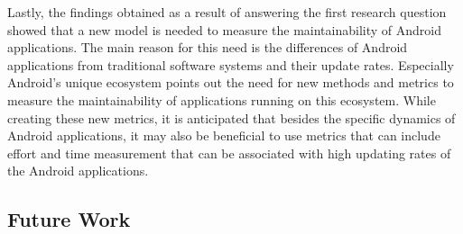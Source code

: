 Lastly, the findings obtained as a result of answering the first research question showed that a new model is needed to measure the maintainability of Android applications. The main reason for this need is the differences of Android applications from traditional software systems and their update rates. Especially Android's unique ecosystem points out the need for new methods and metrics to measure the maintainability of applications running on this ecosystem. While creating these new metrics, it is anticipated that besides the specific dynamics of Android applications, it may also be beneficial to use metrics that can include effort and time measurement that can be associated with high updating rates of the Android applications.

\subsection{Future Work}
